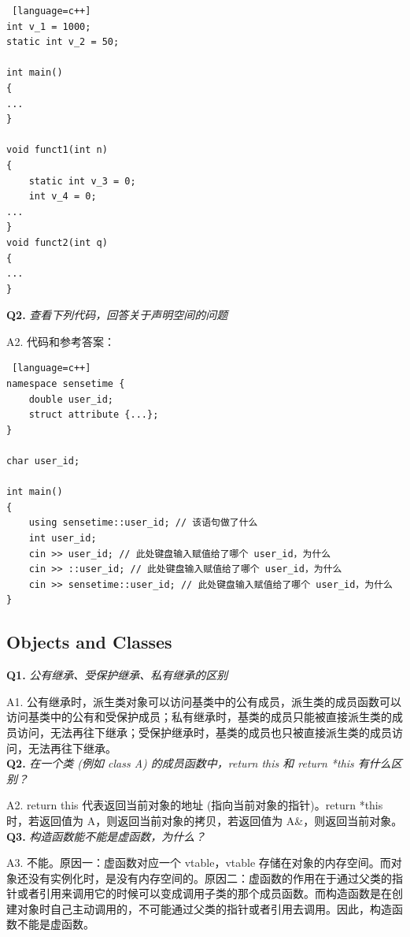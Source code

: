\documentclass[cn,10pt,math=newtx,citestyle=gb7714-2015,bibstyle=gb7714-2015]{elegantbook}
\begin{document}
\begin{lstlisting} [language=c++]
int v_1 = 1000;
static int v_2 = 50;

int main()
{
...
}

void funct1(int n)
{
    static int v_3 = 0;
    int v_4 = 0;
...
}
void funct2(int q)
{
...
}
\end{lstlisting}


\textbf{Q2.} \textit{查看下列代码，回答关于声明空间的问题}

A2. 代码和参考答案：
\begin{lstlisting} [language=c++]
namespace sensetime {
    double user_id;
    struct attribute {...};
}

char user_id;

int main()
{
    using sensetime::user_id; // 该语句做了什么
    int user_id;
    cin >> user_id; // 此处键盘输入赋值给了哪个 user_id，为什么
    cin >> ::user_id; // 此处键盘输入赋值给了哪个 user_id，为什么
    cin >> sensetime::user_id; // 此处键盘输入赋值给了哪个 user_id，为什么
}
\end{lstlisting}

\subsection{Objects and Classes}

\textbf{Q1.} \textit{公有继承、受保护继承、私有继承的区别}

A1. 公有继承时，派生类对象可以访问基类中的公有成员，派生类的成员函数可以访问基类中的公有和受保护成员；私有继承时，基类的成员只能被直接派生类的成员访问，无法再往下继承；受保护继承时，基类的成员也只被直接派生类的成员访问，无法再往下继承。\\


\textbf{Q2.} \textit{在一个类 (例如 class A) 的成员函数中，return this 和 return *this 有什么区别？}

A2. return this 代表返回当前对象的地址 (指向当前对象的指针)。return *this 时，若返回值为 A，则返回当前对象的拷贝，若返回值为 A\&，则返回当前对象。\\


\textbf{Q3.} \textit{构造函数能不能是虚函数，为什么？}

A3. 不能。原因一：虚函数对应一个 vtable，vtable 存储在对象的内存空间。而对象还没有实例化时，是没有内存空间的。原因二：虚函数的作用在于通过父类的指针或者引用来调用它的时候可以变成调用子类的那个成员函数。而构造函数是在创建对象时自己主动调用的，不可能通过父类的指针或者引用去调用。因此，构造函数不能是虚函数。\\
\end{document}
